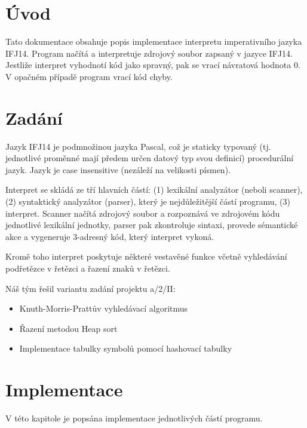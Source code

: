 \documentclass[12pt,a4paper,titlepage,final]{report}
\begin{document}
\pagestyle{plain}
\setcounter{page}{1}
{\hypersetup{linkcolor=black}
\tableofcontents
}

\newpage
\pagestyle{plain}
\setcounter{page}{1}


\chapter{Úvod} \label{uvod}
Tato dokumentace obsahuje popis implementace interpretu imperativního jazyka IFJ14. Program načítá a interpretuje zdrojový soubor zapsaný v jazyce IFJ14. Jestliže interpret vyhodnotí kód jako spravný, pak se vrací návratová hodnota 0. V opačném případě program vrací kód chyby.

\chapter{Zadání} \label{zadani}
Jazyk IFJ14 je podmnožinou jazyka Pascal, což je staticky typovaný (tj. jednotlivé proměnné mají předem určen datový typ svou definicí) procedurální jazyk. Jazyk je case insensitive (nezáleží na velikosti písmen).

Interpret se skládá ze tří hlavních částí: (1) lexikální analyzátor (neboli scanner), (2) syntaktický analyzátor (parser), který je nejdůležitější částí programu, (3) interpret. Scanner načítá zdrojový soubor a rozpoznává ve zdrojovém kódu jednotlivé lexikální jednotky, parser pak zkontroluje sintaxi, provede sémantické akce a vygeneruje 3-adresný kód, který interpret vykoná.

Kromě toho interpret poskytuje některé vestavěné funkce včetně vyhledávání podřetězce v řetězci a řazení znaků v řetězci.

Náš tým řešil variantu zadání projektu a/2/II:
\begin{itemize}
\item Knuth-Morris-Prattův vyhledávací algoritmus
\item Řazení metodou Heap sort
\item Implementace tabulky symbolů pomocí hashovací tabulky
\end{itemize}

\chapter{Implementace} \label{implementace}
V této kapitole je popsána implementace jednotlivých částí programu.
\end{document}
